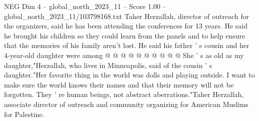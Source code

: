 \begin{textsample}{NEG Dim 4 – global\_north\_2023\_11 – Score 1.00 – global\_north\_2023\_11/103798168.txt}
Taher Herzallah, director of outreach for the organizers, said he has been attending the conferences for 13 years.
He said he brought his children so they could learn from the panels and to help ensure that the memories of his family aren't lost.
He said his father ' s cousin and her 4-year-old daughter were among @ @ @ @ @ @ @ @ @ @ She ' s as old as my daughter,"Herzallah, who lives in Minneapolis, said of the cousin ' s daughter."Her favorite thing in the world was dolls and playing outside.
I want to make sure the world knows their names and that their memory will not be forgotten.
They ' re human beings, not abstract aberrations."Taher Herzallah, associate director of outreach and community organizing for American Muslims for Palestine.

\end{textsample}
